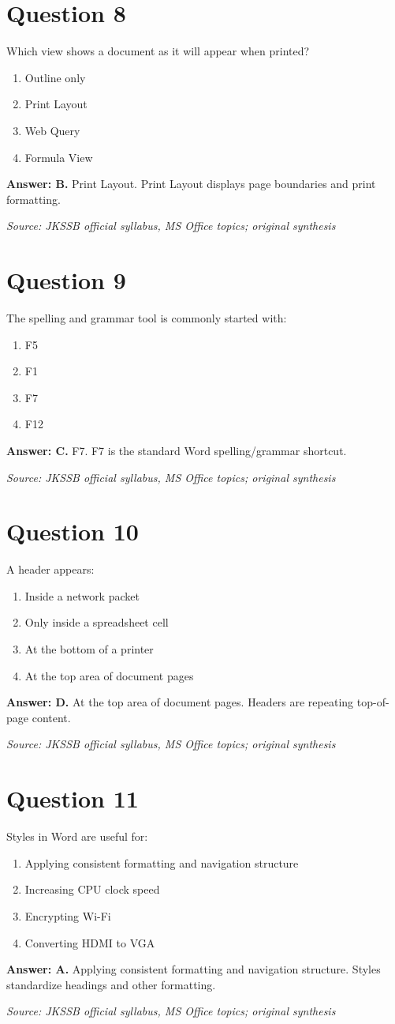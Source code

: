 \documentclass[11pt,a4paper]{book}
\newcommand{\source}[1]{\par\smallskip\textit{Source: #1}}
\newcommand{\answer}[2]{\par\textbf{Answer: #1.} #2}
\begin{document}
\section*{Question 8}
Which view shows a document as it will appear when printed?
\begin{enumerate}[label=\Alph*.]
\item Outline only
\item Print Layout
\item Web Query
\item Formula View
\end{enumerate}
\answer{B}{Print Layout. Print Layout displays page boundaries and print formatting.}
\source{JKSSB official syllabus, MS Office topics; original synthesis}
\section*{Question 9}
The spelling and grammar tool is commonly started with:
\begin{enumerate}[label=\Alph*.]
\item F5
\item F1
\item F7
\item F12
\end{enumerate}
\answer{C}{F7. F7 is the standard Word spelling/grammar shortcut.}
\source{JKSSB official syllabus, MS Office topics; original synthesis}
\section*{Question 10}
A header appears:
\begin{enumerate}[label=\Alph*.]
\item Inside a network packet
\item Only inside a spreadsheet cell
\item At the bottom of a printer
\item At the top area of document pages
\end{enumerate}
\answer{D}{At the top area of document pages. Headers are repeating top-of-page content.}
\source{JKSSB official syllabus, MS Office topics; original synthesis}
\section*{Question 11}
Styles in Word are useful for:
\begin{enumerate}[label=\Alph*.]
\item Applying consistent formatting and navigation structure
\item Increasing CPU clock speed
\item Encrypting Wi-Fi
\item Converting HDMI to VGA
\end{enumerate}
\answer{A}{Applying consistent formatting and navigation structure. Styles standardize headings and other formatting.}
\source{JKSSB official syllabus, MS Office topics; original synthesis}
\end{document}
